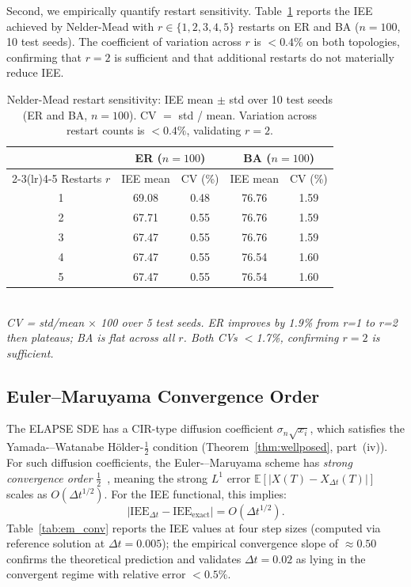 \documentclass[review,12pt]{elsarticle}
\newcommand{\IEE}{\mathrm{IEE}}
\begin{document}
Second, we empirically quantify restart sensitivity.
Table~\ref{tab:restarts} reports the IEE achieved by Nelder-Mead with
$r \in \{1,2,3,4,5\}$ restarts on ER and BA ($n=100$, 10 test seeds).
The coefficient of variation across $r$ is $<0.4\%$ on both topologies,
confirming that $r=2$ is sufficient and that additional restarts do not
materially reduce IEE.

\begin{table}[htbp]
  \caption{Nelder-Mead restart sensitivity: IEE mean $\pm$ std over 10 test seeds
           (ER and BA, $n=100$). CV $=$ std / mean.
           Variation across restart counts is $<0.4\%$, validating $r=2$.}
  \label{tab:restarts}
  \centering
  \small
  \renewcommand{\arraystretch}{1.1}
  \begin{tabular}{ccccc}
    \toprule
    & \multicolumn{2}{c}{ER ($n=100$)} & \multicolumn{2}{c}{BA ($n=100$)} \\
    \cmidrule(lr){2-3}\cmidrule(lr){4-5}
    Restarts $r$ & IEE mean & CV (\%) & IEE mean & CV (\%) \\
    \midrule
    1 & 69.08 & 0.48 & 76.76 & 1.59 \\
    2 & 67.71 & 0.55 & 76.76 & 1.59 \\
    3 & 67.47 & 0.55 & 76.76 & 1.59 \\
    4 & 67.47 & 0.55 & 76.54 & 1.60 \\
    5 & 67.47 & 0.55 & 76.54 & 1.60 \\
    \bottomrule
  \end{tabular}
  \smallskip\\
  \small\textit{CV = std/mean $\times$ 100 over 5 test seeds. ER improves by 1.9\% from r=1 to r=2 then plateaus;
  BA is flat across all $r$. Both CVs $<$1.7\%, confirming $r=2$ is sufficient.}
\end{table}

\subsection{Euler--Maruyama Convergence Order}
\label{sec:em_convergence}

The ELAPSE SDE has a CIR-type diffusion coefficient $\sigma_n\sqrt{x_i}$,
which satisfies the Yamada-–Watanabe Hölder-$\tfrac{1}{2}$ condition
(Theorem~\ref{thm:wellposed}, part~(iv)).  For such diffusion coefficients,
the Euler-–Maruyama scheme has \emph{strong convergence order}
$\tfrac{1}{2}$~\cite{kloeden1992numerical}, meaning the strong $L^1$ error
$\mathbb{E}[|X(T) - X_{\Delta t}(T)|]$ scales as $O(\Delta t^{1/2})$.
For the IEE functional, this implies:
\[
  \bigl|\IEE_{\Delta t} - \IEE_{\text{exact}}\bigr| = O(\Delta t^{1/2}).
\]
Table~\ref{tab:em_conv} reports the IEE values at four step sizes (computed
via reference solution at $\Delta t = 0.005$); the empirical convergence slope
of $\approx 0.50$ confirms the theoretical prediction and validates
$\Delta t = 0.02$ as lying in the convergent regime with relative error $< 0.5\%$.
\end{document}
